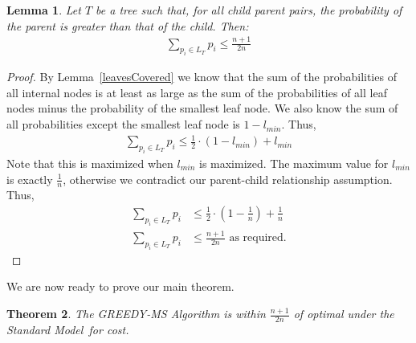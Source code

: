 \documentclass[letterpaper,12pt,titlepage,oneside,final]{book}
\theoremstyle{plain}
\newtheorem{thm}{Theorem}[section]
\newtheorem{lem}[thm]{Lemma}
\begin{document}
\begin{lem}\label{leavesHalf}
Let $T$ be a tree such that, for all child parent pairs, the probability of the parent is greater than that of the child. Then:
\begin{align*}
\sum_{p_i \in L_T} p_i \leq \frac{n+1}{2n}
\end{align*}
\end{lem}
\begin{proof}
By Lemma~\ref{leavesCovered} we know that the sum of the probabilities of all internal nodes is at least as large as the sum of the probabilities of all leaf nodes minus the probability of the smallest leaf node. We also know the sum of all probabilities except the smallest leaf node is $1-l_{min}$. Thus, 
\begin{align*}
\sum_{p_i \in L_T} p_i \leq \frac{1}{2} \cdot (1-l_{min}) + l_{min}
\end{align*}
\noindent Note that this is maximized when $l_{min}$ is maximized. The maximum value for $l_{min}$ is exactly $\frac{1}{n}$, otherwise we contradict our parent-child relationship assumption. Thus,
\begin{align*}
\sum_{p_i \in L_T} p_i &\leq \frac{1}{2} \cdot (1-\frac{1}{n}) + \frac{1}{n} \\
\sum_{p_i \in L_T} p_i &\leq \frac{n+1}{2n} \text{ as required.}
\end{align*}
\end{proof}


We are now ready to prove our main theorem.

\begin{thm}
The GREEDY-MS Algorithm is within $\frac{n+1}{2n}$ of optimal under the Standard Model\ for cost.
\end{thm}
\end{document}
